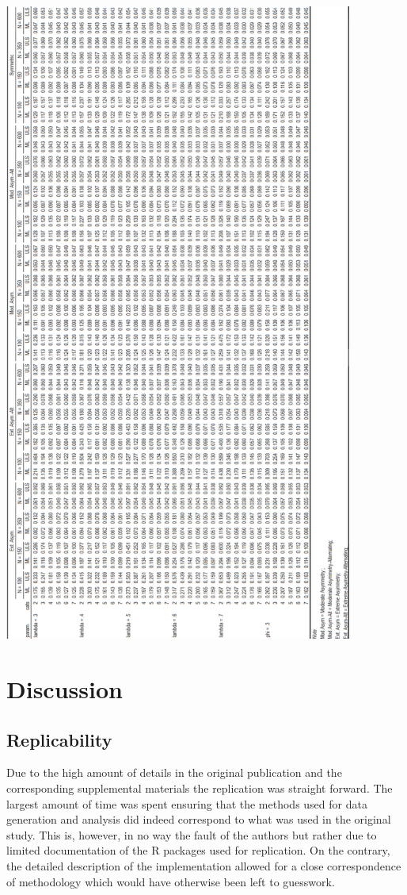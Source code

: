 \documentclass[10,a4paperpaper,]{article}
\begin{document}
\includegraphics[width=325pt]{./figures/tabA13}

\FloatBarrier
\section{Discussion}

\subsection{Replicability}

Due to the high amount of details in the original publication and the
corresponding supplemental materials the replication was straight
forward. The largest amount of time was spent ensuring that the methods
used for data generation and analysis did indeed correspond to what was
used in the original study. This is, however, in no way the fault of the
authors but rather due to limited documentation of the R packages used
for replication. On the contrary, the detailed description of the
implementation allowed for a close correspondence of methodology which
would have otherwise been left to guesswork.
\end{document}
